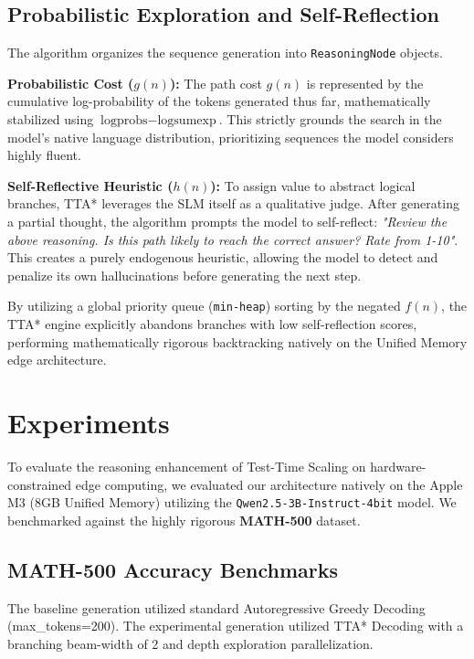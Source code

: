 \documentclass{article} %
\begin{document}
\subsection{Probabilistic Exploration and Self-Reflection}
The algorithm organizes the sequence generation into \texttt{ReasoningNode} objects.

\textbf{Probabilistic Cost ($g(n)$):} The path cost $g(n)$ is represented by the cumulative log-probability of the tokens generated thus far, mathematically stabilized using $\text{logprobs} - \text{logsumexp}$. This strictly grounds the search in the model's native language distribution, prioritizing sequences the model considers highly fluent.

\textbf{Self-Reflective Heuristic ($h(n)$):} To assign value to abstract logical branches, TTA* leverages the SLM itself as a qualitative judge. After generating a partial thought, the algorithm prompts the model to self-reflect: \textit{"Review the above reasoning. Is this path likely to reach the correct answer? Rate from 1-10"}. This creates a purely endogenous heuristic, allowing the model to detect and penalize its own hallucinations before generating the next step.

By utilizing a global priority queue (\texttt{min-heap}) sorting by the negated $f(n)$, the TTA* engine explicitly abandons branches with low self-reflection scores, performing mathematically rigorous backtracking natively on the Unified Memory edge architecture.

\section{Experiments}
\label{sec:experiments}

To evaluate the reasoning enhancement of Test-Time Scaling on hardware-constrained edge computing, we evaluated our architecture natively on the Apple M3 (8GB Unified Memory) utilizing the \texttt{Qwen2.5-3B-Instruct-4bit} model. We benchmarked against the highly rigorous \textbf{MATH-500} dataset.

\subsection{MATH-500 Accuracy Benchmarks}

The baseline generation utilized standard Autoregressive Greedy Decoding (max\_tokens=200). The experimental generation utilized TTA* Decoding with a branching beam-width of 2 and depth exploration parallelization.
\end{document}
